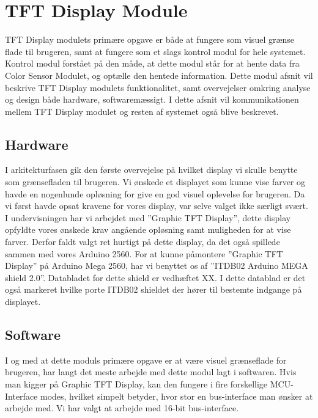\graphicspath{{Chapters/Struktur/}}

\section{TFT Display Module}
TFT Display modulets primære opgave er både at fungere som visuel grænse flade til brugeren, samt at fungere som et slags kontrol modul for hele systemet. Kontrol modul forstået på den måde, at dette modul står for at hente data fra Color Sensor Modulet, og optælle den hentede information. Dette modul afsnit vil beskrive TFT Display modulets funktionalitet, samt overvejelser omkring analyse og design både hardware, softwaremæssigt. I dette afsnit vil kommunikationen mellem TFT Display modulet og resten af systemet også blive beskrevet. 

\subsection{Hardware}
I arkitekturfasen gik den første overvejelse på hvilket display vi skulle benytte som grænsefladen til brugeren. Vi ønskede et displayet som kunne vise farver og havde en nogenlunde opløsning for give en god visuel oplevelse for brugeren. Da vi først havde opsat kravene for vores display, var selve valget ikke særligt svært. I undervisningen har vi arbejdet med ”Graphic TFT Display”, dette display opfyldte vores ønskede krav angående opløsning samt muligheden for at vise farver. Derfor faldt valgt ret hurtigt på dette display, da det også spillede sammen med vores Arduino 2560. For at kunne påmontere ”Graphic TFT Display” på Arduino Mega 2560, har vi benyttet os af ”ITDB02 Arduino MEGA shield 2.0”. Databladet for dette shield er vedhæftet XX. I dette datablad er det også markeret hvilke porte ITDB02 shieldet der hører til bestemte indgange på displayet.

\subsection{Software}
I og med at dette moduls primære opgave er at være visuel grænseflade for brugeren, har langt det meste arbejde med dette modul lagt i softwaren. 
Hvis man kigger på Graphic TFT Display, kan den fungere i fire forskellige MCU-Interface modes, hvilket simpelt betyder, hvor stor en bus-interface man ønsker at arbejde med. Vi har valgt at arbejde med 16-bit bus-interface. 

